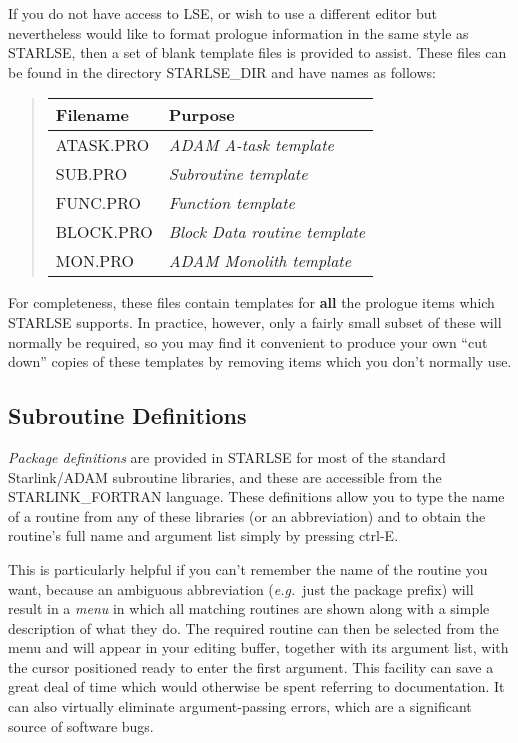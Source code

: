 If you do not have access to \mbox{LSE}, or wish to use a different editor
but nevertheless would like to format prologue information in the same style
as \mbox{STARLSE}, then a set of blank template files is provided to
assist.
These files can be found in the directory \mbox{STARLSE\_DIR} and have names
as follows:

\begin{quote}
\begin{center}
\begin{tabular}{|l|l|}
\hline
{\bf Filename} & {\bf Purpose} \\
\hline \hline
ATASK.PRO & {\em ADAM A-task template} \\
SUB.PRO & {\em Subroutine template} \\
FUNC.PRO & {\em Function template} \\
BLOCK.PRO & {\em Block Data routine template} \\
MON.PRO & {\em ADAM Monolith template} \\
\hline
\end{tabular}
\end{center}
\end{quote}

For completeness, these files contain templates for {\bf all} the prologue
items which \mbox{STARLSE} supports.
In practice, however, only a fairly small subset of these will normally be
required, so you may find it convenient to produce your own ``cut down''
copies of these templates by removing items which you don't normally use.


\subsection{Subroutine Definitions}

{\em Package definitions} are provided in \mbox{STARLSE} for most of the
standard Starlink/\mbox{ADAM} subroutine libraries, and these are accessible
from the \mbox{STARLINK\_FORTRAN} language.
These definitions allow you to type the name of a routine from any of these
libraries (or an abbreviation) and to obtain the routine's full name and
argument list simply by pressing \mbox{ctrl-E}.

This is particularly helpful if you can't remember the name of the routine
you want, because an ambiguous abbreviation ({\em e.g.}\ just the package
prefix) will result in a {\em menu} in which all matching routines are shown
along with a simple description of what they do.
The required routine can then be selected from the menu and will appear in
your editing buffer, together with its argument list, with the cursor
positioned ready to enter the first argument.
This facility can save a great deal of time which would otherwise be spent
referring to documentation.
It can also virtually eliminate argument-passing errors, which are a
significant source of software bugs.

